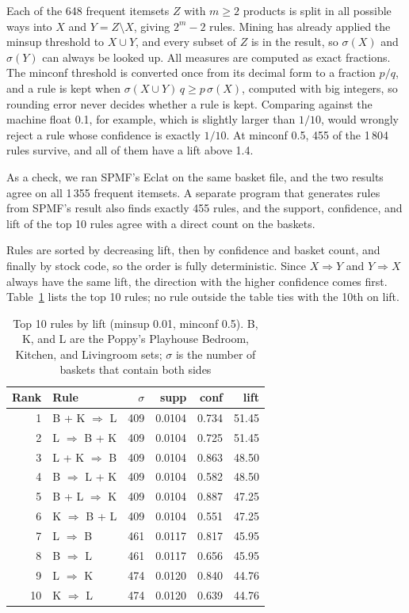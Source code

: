 Each of the 648 frequent itemsets $Z$ with $m \ge 2$ products is split in all possible ways into $X$ and $Y = Z \setminus X$, giving $2^m - 2$ rules. Mining has
already applied the minsup threshold to $X \cup Y$, and every subset of $Z$ is in the
result, so $\sigma(X)$ and $\sigma(Y)$ can always be looked up. All measures are computed
as exact fractions. The minconf threshold is converted once from its decimal form to a
fraction $p/q$, and a rule is kept when $\sigma(X \cup Y)\, q \ge p\, \sigma(X)$, computed
with big integers, so rounding error never decides whether a rule is kept. Comparing
against the machine float 0.1, for example, which is slightly larger than $1/10$, would
wrongly reject a rule whose confidence is exactly $1/10$. At minconf 0.5, 455 of the
1\,804 rules survive, and all of them have a lift above 1.4.

As a check, we ran SPMF's Eclat on the same basket file, and the two results agree on all
1\,355 frequent itemsets. A separate program that generates rules from SPMF's result also
finds exactly 455 rules, and the support, confidence, and lift of the top 10 rules agree
with a direct count on the baskets.

Rules are sorted by decreasing lift, then by confidence and basket count, and finally by
stock code, so the order is fully deterministic. Since $X \Rightarrow Y$ and
$Y \Rightarrow X$ always have the same lift, the direction with the higher confidence
comes first. Table~\ref{tab:top-rules} lists the top 10 rules; no rule outside the table
ties with the 10th on lift.

\begin{table}[t]
\centering
\caption{Top 10 rules by lift (minsup 0.01, minconf 0.5). B, K, and L are the Poppy's
Playhouse Bedroom, Kitchen, and Livingroom sets; $\sigma$ is the number of baskets that
contain both sides}
\label{tab:top-rules}
\begin{tabular}{rlrrrr}
\hline
Rank & Rule & $\sigma$ & supp & conf & lift \\
\hline
1 & B + K $\Rightarrow$ L & 409 & 0.0104 & 0.734 & 51.45 \\
2 & L $\Rightarrow$ B + K & 409 & 0.0104 & 0.725 & 51.45 \\
3 & L + K $\Rightarrow$ B & 409 & 0.0104 & 0.863 & 48.50 \\
4 & B $\Rightarrow$ L + K & 409 & 0.0104 & 0.582 & 48.50 \\
5 & B + L $\Rightarrow$ K & 409 & 0.0104 & 0.887 & 47.25 \\
6 & K $\Rightarrow$ B + L & 409 & 0.0104 & 0.551 & 47.25 \\
7 & L $\Rightarrow$ B & 461 & 0.0117 & 0.817 & 45.95 \\
8 & B $\Rightarrow$ L & 461 & 0.0117 & 0.656 & 45.95 \\
9 & L $\Rightarrow$ K & 474 & 0.0120 & 0.840 & 44.76 \\
10 & K $\Rightarrow$ L & 474 & 0.0120 & 0.639 & 44.76 \\
\hline
\end{tabular}
\end{table}

